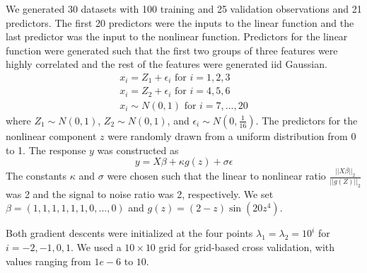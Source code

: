 \documentclass[10pt,letterpaper]{article}
\begin{document}
We generated 30 datasets with 100 training and 25 validation observations and 21 predictors. The first 20 predictors were the inputs to the linear function and the last predictor was the input to the nonlinear function. Predictors for the linear function were generated such that the first two groups of three features were highly correlated and the rest of the features were generated iid Gaussian.
\begin{equation}
\begin{array}{c}
x_i = Z_1 + \epsilon_i \text{ for } i=1, 2, 3 \\
x_i = Z_2 + \epsilon_i \text{ for } i= 4, 5, 6 \\
x_i \sim N(0,1) \text{ for } i = 7, ..., 20
\end{array}
\end{equation}
where $Z_1 \sim N(0,1)$, $Z_2 \sim N(0,1)$, and $\epsilon_i \sim N(0, \frac{1}{16})$. The predictors for the nonlinear component $z$ were randomly drawn from a uniform distribution from 0 to 1. The response $y$ was constructed as
\begin{equation}
y = X\beta + \kappa g(z) + \sigma \epsilon
\end{equation}
The constants $\kappa$ and $\sigma$ were chosen such that the linear to nonlinear ratio $\frac{||X\beta||_2}{||g(Z)||_2}$ was 2 and the signal to noise ratio was 2, respectively. We set $\beta = (1, 1, 1, 1, 1, 1, 0, ..., 0)$ and $g(z) =(2-z)\sin(20z^4)$.

Both gradient descents were initialized at the four points $\lambda_1 = \lambda_2 = 10^i$ for $i=-2, -1, 0, 1$. We used a $10 \times 10$ grid for grid-based cross validation, with values ranging from $1e-6$ to $10$.
\end{document}
